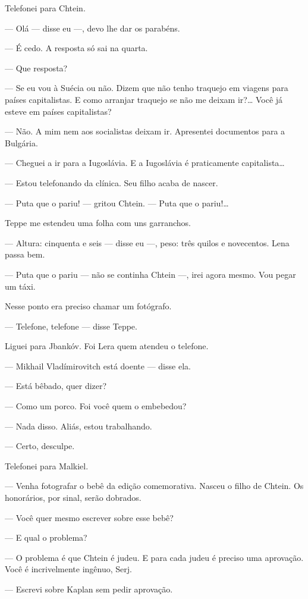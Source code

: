 Telefonei para Chtein.

--- Olá --- disse eu ---, devo lhe dar os parabéns.

--- É cedo. A resposta só sai na quarta.

--- Que resposta?

--- Se eu vou à Suécia ou não. Dizem que não tenho traquejo em viagens
para países capitalistas. E como arranjar traquejo se não me deixam
ir?\ldots{} Você já esteve em países capitalistas?

--- Não. A mim nem aos socialistas deixam ir. Apresentei documentos para
a Bulgária.

--- Cheguei a ir para a Iugoslávia. E a Iugoslávia é praticamente
capitalista\ldots{}

--- Estou telefonando da clínica. Seu filho acaba de nascer.

--- Puta que o pariu! --- gritou Chtein. --- Puta que o pariu!\ldots{}

Teppe me estendeu uma folha com uns garranchos.

--- Altura: cinquenta e seis --- disse eu ---, peso: três quilos e
novecentos. Lena passa bem.

--- Puta que o pariu --- não se continha Chtein ---, irei agora mesmo.
Vou pegar um táxi.

Nesse ponto era preciso chamar um fotógrafo.

--- Telefone, telefone --- disse Teppe.

Liguei para Jbankóv. Foi Lera quem atendeu o telefone.

--- Mikhail Vladímirovitch está doente --- disse ela.

--- Está bêbado, quer dizer?

--- Como um porco. Foi você quem o embebedou?

--- Nada disso. Aliás, estou trabalhando.

--- Certo, desculpe.

Telefonei para Malkiel.

--- Venha fotografar o bebê da edição comemorativa. Nasceu o filho de
Chtein. Os honorários, por sinal, serão dobrados.

--- Você quer mesmo escrever sobre esse bebê?

--- E qual o problema?

--- O problema é que Chtein é judeu. E para cada judeu é preciso uma
aprovação. Você é incrivelmente ingênuo, Serj.

--- Escrevi sobre Kaplan sem pedir aprovação.

